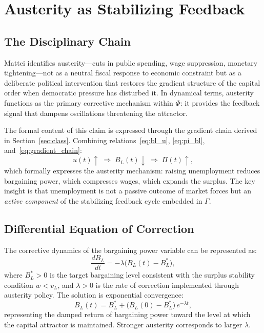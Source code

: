 \documentclass[12pt,a4paper]{article}
\theoremstyle{definition}
\theoremstyle{remark}
\begin{document}
\section{Austerity as Stabilizing Feedback}
\label{sec:austerity}

\subsection{The Disciplinary Chain}

Mattei identifies austerity---cuts in public spending, wage suppression, monetary tightening---not as a neutral fiscal response to economic constraint but as a deliberate political intervention that restores the gradient structure of the capital order when democratic pressure has disturbed it. In dynamical terms, austerity functions as the primary corrective mechanism within $\Phi$: it provides the feedback signal that dampens oscillations threatening the attractor.

The formal content of this claim is expressed through the gradient chain derived in Section~\ref{sec:class}. Combining relations~\eqref{eq:bl_u}, \eqref{eq:pi_bl}, and~\eqref{eq:gradient_chain}:
\begin{equation}
  \label{eq:austerity_chain}
  u(t) \uparrow \;\Rightarrow\; B_L(t) \downarrow \;\Rightarrow\; \Pi(t) \uparrow,
\end{equation}
which formally expresses the austerity mechanism: raising unemployment reduces bargaining power, which compresses wages, which expands the surplus. The key insight is that unemployment is not a passive outcome of market forces but an \emph{active component} of the stabilizing feedback cycle embedded in $\Gamma$.

\subsection{Differential Equation of Correction}

The corrective dynamics of the bargaining power variable can be represented as:
\begin{equation}
  \label{eq:bl_ode}
  \frac{dB_L}{dt} = -\lambda\bigl(B_L(t) - B_L^*\bigr),
\end{equation}
where $B_L^* > 0$ is the target bargaining level consistent with the surplus stability condition $w < v_L$, and $\lambda > 0$ is the rate of correction implemented through austerity policy. The solution is exponential convergence:
\begin{equation}
  B_L(t) = B_L^* + \bigl(B_L(0) - B_L^*\bigr)\,e^{-\lambda t},
\end{equation}
representing the damped return of bargaining power toward the level at which the capital attractor is maintained. Stronger austerity corresponds to larger $\lambda$.
\end{document}
